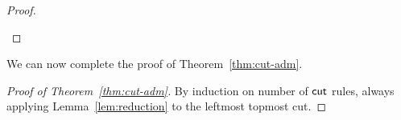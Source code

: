 \begin{proof}
\begin{description}
\begin{itemize}
\begin{smallequation*}
\end{smallequation*}

\begin{smallequation*}
\end{smallequation*}
                \end{itemize}
                \end{description}
\end{proof}


                We can now complete the proof of Theorem~\ref{thm:cut-adm}.
\begin{proof}[Proof of Theorem~\ref{thm:cut-adm}]
			By induction on number of $\mathsf{cut}$ rules, always applying Lemma~\ref{lem:reduction} to the leftmost topmost cut.
\end{proof}

%
%
%	
%	
